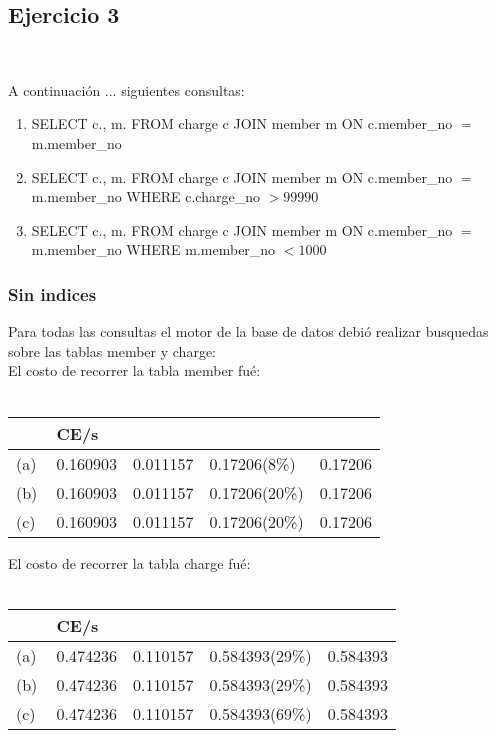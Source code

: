 \subsection{Ejercicio 3}\

A continuación ... siguientes consultas:
\begin{enumerate}[label=(\alph*)]
\item{SELECT c.\*, m.\* FROM charge c JOIN member m ON c.member\_no $=$ m.member\_no}

\item{SELECT c.\*, m.\* FROM charge c JOIN member m ON c.member\_no $=$ m.member\_no WHERE c.charge\_no $> 99990$}

\item{SELECT c.\*, m.\* FROM charge c JOIN member m ON c.member\_no $=$ m.member\_no WHERE m.member\_no $< 1000$}

\end{enumerate}

\subsubsection{Sin indices}

Para todas las consultas el motor de la base de datos debió realizar busquedas sobre las tablas member y charge: \\  

El costo de recorrer la tabla member fué: \\ \\

\begin{tabular}{| L | L | L | L | L |}
    \hline
     & CE/s &  &  &  \\ \hline
    (a) & 0.160903 & 0.011157 & 0.17206(8\%) & 0.17206 \\ \hline
    (b) & 0.160903 & 0.011157 & 0.17206(20\%) & 0.17206 \\ \hline
    (c) & 0.160903 & 0.011157 & 0.17206(20\%) & 0.17206 \\ \hline
\end{tabular}

El costo de recorrer la tabla charge fué: \\ \\

\begin{tabular}{| L | L | L | L | L |}
    \hline
     & CE/s &  &  &  \\ \hline
    (a) & 0.474236 & 0.110157 & 0.584393(29\%) & 0.584393 \\ \hline
    (b) & 0.474236 & 0.110157 & 0.584393(29\%) & 0.584393 \\ \hline
    (c) & 0.474236 & 0.110157 & 0.584393(69\%) & 0.584393 \\ \hline
\end{tabular}

